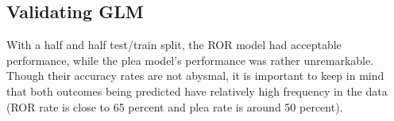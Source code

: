\subsection{Validating GLM}
With a half and half test/train split,
the ROR model had acceptable performance,
while the plea model's performance was rather unremarkable.
Though their accuracy rates are not abysmal,
it is important to keep in mind that
both outcomes being predicted have relatively high frequency in the data
(ROR rate is close to 65 percent and plea rate is around 50 percent).
